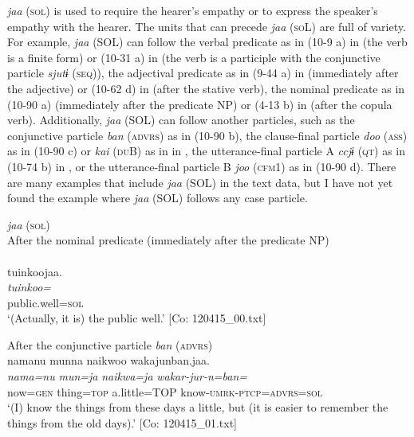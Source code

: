 \textit{jaa} (\textsc{sol}) is used to require the hearer’s empathy or to express the speaker’s empathy with the hearer. The units that can precede \textit{jaa} (\textsc{so}L) are full of variety. For example, \textit{jaa} (SOL) can follow the verbal predicate as in (10-9 a) in  (the verb is a finite form) or (10-31 a) in  (the verb is a participle with the conjunctive particle \textit{sjutɨ} (\textsc{seq})), the adjectival predicate as in (9-44 a) in  (immediately after the adjective) or (10-62 d) in  (after the stative verb), the nominal predicate as in (10-90 a) (immediately after the predicate NP) or (4-13 b) in  (after the copula verb). Additionally, \textit{jaa} (SOL) can follow another particles, such as the conjunctive particle \textit{ban} (\textsc{advrs}) as in (10-90 b), the clause-final particle \textit{doo} (\textsc{ass}) as in (10-90 c) or \textit{kai} (\textsc{du}B) as in  in , the utterance-final particle A \textit{ccjɨ} (\textsc{qt}) as in (10-74 b) in , or the utterance-final particle B \textit{joo} (\textsc{cfm}1) as in (10-90 d). There are many examples that include \textit{jaa} (SOL) in the text data, but I have not yet found the example where \textit{jaa} (SOL) follows any case particle.

\ea\label{ex:10.90}   \textit{jaa} (\textsc{sol})\\
  \ea After the nominal predicate (immediately after the predicate NP)\\\\
      \glll    tuinkoojaa.\\
    \textit{tuinkoo=}\\
    public.well=\textsc{sol}\\
  \glt     ‘(Actually, it is) the public well.’ [Co: 120415\_00.txt]

  \ex After the conjunctive particle \textit{ban} (\textsc{advrs})\\
      \glll    namanu  munna  naikwoo  wakajunban.jaa.\\
    \textit{nama=nu}  \textit{mun=ja}  \textit{naikwa=ja}  \textit{wakar-jur-n=ban=}\\
    now=\textsc{gen}  thing=\textsc{top}  a.little=TOP  know-\textsc{umrk}-\textsc{ptcp}=\textsc{advrs}=\textsc{sol}\\
  \glt     ‘(I) know the things from these days a little, but (it is easier to remember the things from the old days).’ [Co: 120415\_01.txt]


